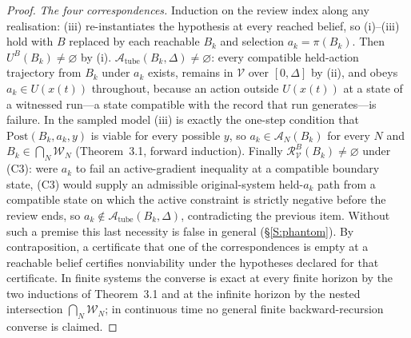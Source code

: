 \documentclass[11pt,a4paper]{article}
\theoremstyle{plain}
\theoremstyle{definition}
\theoremstyle{remark}
\newcommand{\cV}{\mathcal{V}}
\newcommand{\cR}{\mathcal{R}}
\newcommand{\cA}{\mathcal{A}}
\newcommand{\cW}{\mathcal{W}}
\newcommand{\Post}{\mathrm{Post}}
\newcommand{\Atube}{\cA_{\mathrm{tube}}}
\newcommand{\hyp}[1]{\textup{(#1)}}
\begin{document}
\begin{proof}
\emph{The four correspondences.} Induction on the review index along any realisation: (iii) re-instantiates the hypothesis at every reached belief, so (i)--(iii) hold with $B$ replaced by each reachable $B_k$ and selection $a_k=\pi(B_k)$. Then $U^B(B_k)\ne\varnothing$ by (i). $\Atube(B_k,\Delta)\ne\varnothing$: every compatible held-action trajectory from $B_k$ under $a_k$ exists, remains in $\cV$ over $[0,\Delta]$ by (ii), and obeys $a_k\in U(x(t))$ throughout, because an action outside $U(x(t))$ at a state of a witnessed run---a state compatible with the record that run generates---is failure. In the sampled model (iii) is exactly the one-step condition that $\Post(B_k,a_k,y)$ is viable for every possible $y$, so $a_k\in\cA_N(B_k)$ for every $N$ and $B_k\in\bigcap_N\cW_N$ (Theorem~3.1, forward induction). Finally $\cR^B_\cV(B_k)\ne\varnothing$ under \hyp{C3}: were $a_k$ to fail an active-gradient inequality at a compatible boundary state, \hyp{C3} would supply an admissible original-system held-$a_k$ path from a compatible state on which the active constraint is strictly negative before the review ends, so $a_k\notin\Atube(B_k,\Delta)$, contradicting the previous item. Without such a premise this last necessity is false in general (\S\ref{S:phantom}). By contraposition, a certificate that one of the correspondences is empty at a reachable belief certifies nonviability under the hypotheses declared for that certificate. In finite systems the converse is exact at every finite horizon by the two inductions of Theorem~3.1 and at the infinite horizon by the nested intersection $\bigcap_N\cW_N$; in continuous time no general finite backward-recursion converse is claimed.
\end{proof}
\end{document}

